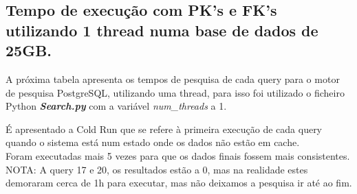 \documentclass{article}
\begin{document}
  \clearpage

\subsection{Tempo de execução com PK's e FK's utilizando 1 thread numa base de dados de 25GB.}
\texttt{}\par A próxima tabela apresenta os tempos de pesquisa de cada query para o motor de pesquisa PostgreSQL, utilizando uma thread, para isso foi utilizado o ficheiro Python \textbf{\textit{Search.py}}  com a variável \textit{num\_threads} a 1. 
\texttt{}\par É apresentado a Cold Run que se refere à primeira execução de cada query quando o sistema está num estado onde os dados não estão em cache.\\
Foram executadas mais 5 vezes para que os dados finais fossem mais consistentes.\\
NOTA: A query 17 e 20, os resultados estão a 0, mas na realidade estes demoraram cerca de 1h para executar, mas não deixamos a pesquisa ir até ao fim.
\end{document}
